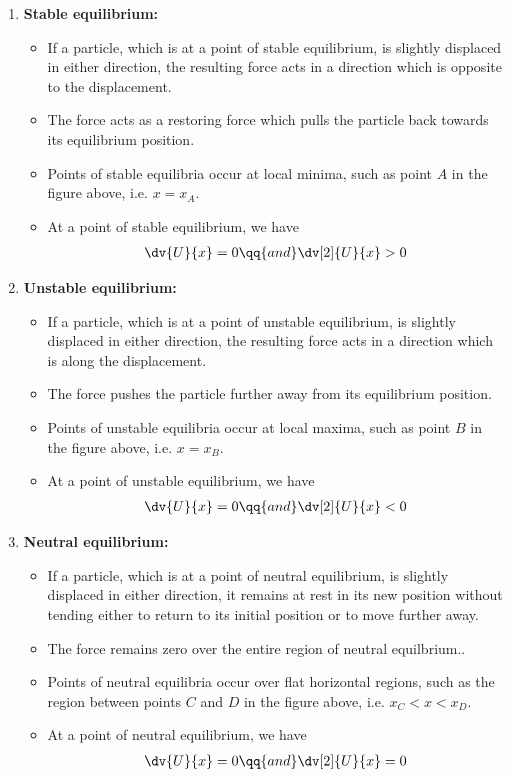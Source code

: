 		\begin{enumerate}
			\item \textbf{Stable equilibrium:}
				\begin{itemize}
					\item If a particle, which is at a point of stable equilibrium, is slightly displaced in either direction, the resulting force acts in a direction which is opposite to the displacement.
					\item The force acts as a restoring force which pulls the particle back towards its equilibrium position.
					\item Points of stable equilibria occur at local minima, such as point $A$ in the figure above, i.e. $x=x_A$.
					\item At a point of stable equilibrium, we have
					\begin{align*}
						\dv{U}{x}=0\qq{and}\dv[2]{U}{x}>0
					\end{align*}
				\end{itemize}
			
			\item \textbf{Unstable equilibrium:}
				\begin{itemize}
					\item If a particle, which is at a point of unstable equilibrium, is slightly displaced in either direction, the resulting force acts in a direction which is along the displacement.
					\item The force pushes the particle further away from its equilibrium position.
					\item Points of unstable equilibria occur at local maxima, such as point $B$ in the figure above, i.e. $x=x_B$.
					\item At a point of unstable equilibrium, we have
					\begin{align*}
						\dv{U}{x}=0\qq{and}\dv[2]{U}{x}<0
					\end{align*}
				\end{itemize}
			
			\item \textbf{Neutral equilibrium:}
				\begin{itemize}
					\item If a particle, which is at a point of neutral equilibrium, is slightly displaced in either direction, it remains at rest in its new position without tending either to return to its initial position or to move further away.
					\item The force remains zero over the entire region of neutral equilbrium..
					\item Points of neutral equilibria occur over flat horizontal regions, such as the region between points $C$ and $D$ in the figure above, i.e. $x_C<x<x_D$.
					\item At a point of neutral equilibrium, we have
					\begin{align*}
						\dv{U}{x}=0\qq{and}\dv[2]{U}{x}=0
					\end{align*}
				\end{itemize}
		\end{enumerate}